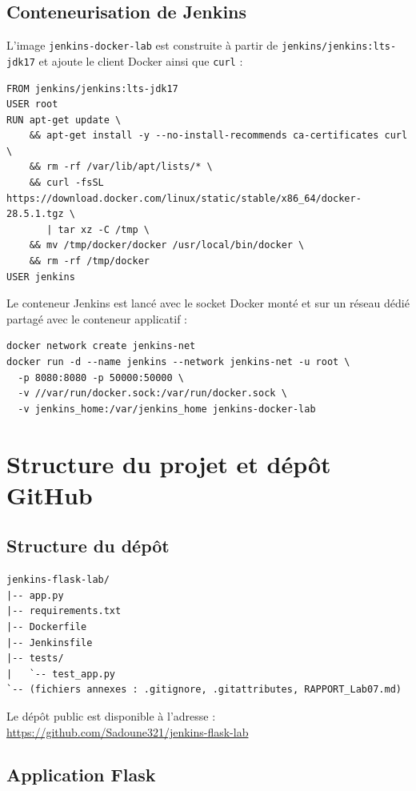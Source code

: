 \documentclass[11pt,a4paper]{article}
\begin{document}
\subsection{Conteneurisation de Jenkins}

L'image \texttt{jenkins-docker-lab} est construite à partir de
\texttt{jenkins/jenkins:lts-jdk17} et ajoute le client Docker ainsi que
\texttt{curl} :

\begin{lstlisting}[caption={Dockerfile de l'image Jenkins (hors dépôt applicatif).}]
FROM jenkins/jenkins:lts-jdk17
USER root
RUN apt-get update \
    && apt-get install -y --no-install-recommends ca-certificates curl \
    && rm -rf /var/lib/apt/lists/* \
    && curl -fsSL https://download.docker.com/linux/static/stable/x86_64/docker-28.5.1.tgz \
       | tar xz -C /tmp \
    && mv /tmp/docker/docker /usr/local/bin/docker \
    && rm -rf /tmp/docker
USER jenkins
\end{lstlisting}

Le conteneur Jenkins est lancé avec le socket Docker monté et sur un réseau dédié
partagé avec le conteneur applicatif :

\begin{lstlisting}
docker network create jenkins-net
docker run -d --name jenkins --network jenkins-net -u root \
  -p 8080:8080 -p 50000:50000 \
  -v //var/run/docker.sock:/var/run/docker.sock \
  -v jenkins_home:/var/jenkins_home jenkins-docker-lab
\end{lstlisting}

\section{Structure du projet et dépôt GitHub}

\subsection{Structure du dépôt}

\begin{lstlisting}
jenkins-flask-lab/
|-- app.py
|-- requirements.txt
|-- Dockerfile
|-- Jenkinsfile
|-- tests/
|   `-- test_app.py
`-- (fichiers annexes : .gitignore, .gitattributes, RAPPORT_Lab07.md)
\end{lstlisting}

Le dépôt public est disponible à l'adresse :
\url{https://github.com/Sadoune321/jenkins-flask-lab}

\subsection{Application Flask}
\end{document}

